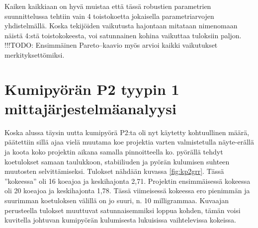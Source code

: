 \documentclass[12pt,a4paper,finnish]{tutthesis}
\newcommand\todo[1]{{\color{red}!!!TODO: #1}} %
\begin{document}
Kaiken kaikkiaan on hyvä muistaa että tässä robustien parametrien suunnittelussa tehtiin vain 4 toistokoetta jokaisella parametriarvojen yhdistelmällä.
Koska tekijöiden vaikutusta hajontaan mitataan nimenomaan näistä 4:stä toistokokeesta,
voi satunnainen kohina vaikuttaa tuloksiin paljon.
\todo{Ensimmäinen Pareto–kaavio myös arvioi kaikki vaikutukset merkityksettömiksi.}

\section{Kumipyörän P2 tyypin 1 mittajärjestelmäanalyysi}

Koska alussa täysin uutta kumipyörä P2:ta oli nyt käytetty kohtuullinen määrä, päätettiin sillä ajaa vielä muutama koe projektia varten valmistetulla näyte-erällä ja koota koko projektin aikana samalla pinnoitteella ko. pyörällä tehdyt koetulokset samaan taulukkoon, stabiiliuden ja pyörän kulumisen suhteen muutosten selvittämiseksi. Tulokset nähdään kuvassa \ref{fig:kp2grr}.
Tässä ”kokeessa” oli 16 koeajoa ja keskihajonta 2,71. Projektin ensimmäisessä kokeessa oli 20 koeajoa ja keskihajonta 1,78. Tässä viimeisessä kokeessa ero pienimmän ja suurimman koetuloksen välillä on jo suuri, n. 10 milligrammaa. Kuvaajan perusteella tulokset
muuttuvat
satunnaisemmiksi loppua kohden, tämän voisi kuvitella johtuvan kumipyörän kulumisesta lukuisissa vaihtelevissa kokeissa.
\end{document}
